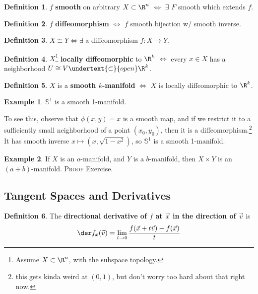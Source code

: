 \documentclass[a5paper]{article}
\theoremstyle{definition}%
\newtheorem*{definition*}{Definition}
\newtheorem*{example*}{Example}
\numberwithin{exercise}{section}
\theoremstyle{remark}%
\renewcommand{\S}{\mathbb{S}}
\newcommand{\subsetopen}{\undertext{\subset}{open}}
\newcommand{\diffeo}{\cong}
\renewcommand{\emph}{\textbf}
\begin{document}
\begin{definition*}
$f$ \emph{smooth} on arbitrary $X\subset \R^n$ $\iff$ $\exists$ $F$ smooth which extends $f$. 
\end{definition*}

\begin{definition*}
$f$ \emph{diffeomorphism} $\iff$ $f$ smooth bijection w/ smooth inverse. 
\end{definition*}

\begin{definition*}
$X\diffeo Y \iff \exists$ a diffeomorphism $f:X\to Y$. 
\end{definition*}

\begin{definition*}
$X$\footnote{Assume $X\subset \R^n$, with the subspace topology.} \emph{locally diffeomorphic} to $\R^k$ $\iff$ 
every $x\in X$ has a neighborhood $U\diffeo V\subsetopen \R^k$. 
\end{definition*}

\begin{definition*}
$X$ is a \emph{smooth $k$-manifold} $\iff$ $X$ is locally diffeomorphic to $\R^k$.
\end{definition*}

\begin{example*}
$\S^1$ is a smooth 1-manifold. 


To see this, observe that $\phi(x,y)=x$ is a smooth map, and if we restrict it to a sufficiently small neighborhood of a point $(x_0, y_0)$, then it is a diffeomorphism.\footnote{this gets kinda weird at $(0,1)$, but don't worry too hard about that right now.} It has smooth inverse $x\mapsto(x,\sqrt{1-x^2})$, so $\S^1$ is a smooth 1-manifold. 
\end{example*}

\begin{example*}
If $X$ is an $a$-manifold, and $Y$ is a $b$-manifold, then $X\times Y$ is an $(a+b)$-manifold. \textsc{Proof} Exercise.
\end{example*}

\subsection{Tangent Spaces and Derivatives}
\begin{definition*}
The \emph{directional derivative	of $f$ at $\vec{x}$ in the direction of $\vec{v}$} is 
$$\der f_{\vec{x}}(\vec{v}) = \lim_{t\to0} \frac{f(\vec{x}+t\vec{v})-f(\vec{x})}{t}
$$
\end{definition*}
\end{document}
